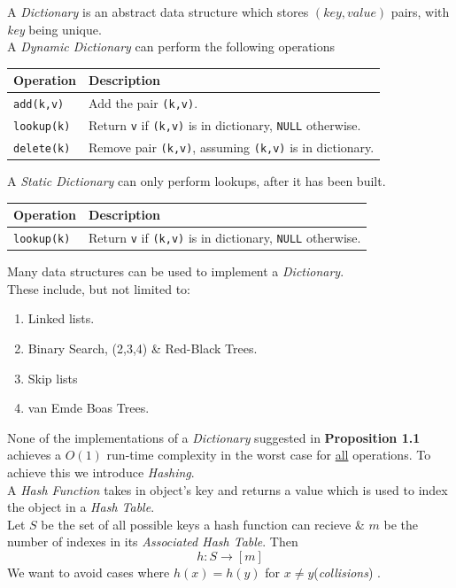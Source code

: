 \documentclass[11pt,a4paper]{article}
\begin{document}
A \textit{Dictionary} is an abstract data structure which stores $(\textit{key},\textit{value})$ pairs, with \textit{key} being unique.\\
A \textit{Dynamic Dictionary} can perform the following operations
\begin{center}
\begin{tabular}{l|l}
\textbf{Operation}&\textbf{Description}\\\hline
\lstinline!add(k,v)!&Add the pair \lstinline!(k,v)!.\\
\lstinline!lookup(k)!&Return \lstinline!v! if \lstinline!(k,v)! is in dictionary, \lstinline!NULL! otherwise.\\
\lstinline!delete(k)!&Remove pair \lstinline!(k,v)!, assuming \lstinline!(k,v)! is in dictionary.
\end{tabular}
\end{center}
A \textit{Static Dictionary} can only perform lookups, after it has been built.
\begin{center}
\begin{tabular}{l|l}
\textbf{Operation}&\textbf{Description}\\\hline
\lstinline!lookup(k)!&Return \lstinline!v! if \lstinline!(k,v)! is in dictionary, \lstinline!NULL! otherwise.
\end{tabular}
\end{center}

Many data structures can be used to implement a \textit{Dictionary}.\\
These include, but not limited to:
\begin{enumerate}
	\item Linked lists.
	\item Binary Search, (2,3,4) \& Red-Black Trees.
	\item Skip lists
	\item van Emde Boas Trees.
\end{enumerate}

None of the implementations of a \textit{Dictionary} suggested in \textbf{Proposition 1.1} achieves a $O(1)$ run-time complexity in the worst case for \underline{all} operations. To achieve this we introduce \textit{Hashing}.\\

A \textit{Hash Function} takes in object's key and returns a value which is used to index the object in a \textit{Hash Table}.\\
Let $S$ be the set of all possible keys a hash function can recieve \& $m$ be the number of indexes in its \textit{Associated Hash Table}. Then
$$h:S\to[m]$$
\nb We want to avoid cases where $h(x)=h(y)$ for $x\neq y$(\textit{collisions}) .\\
\end{document}
